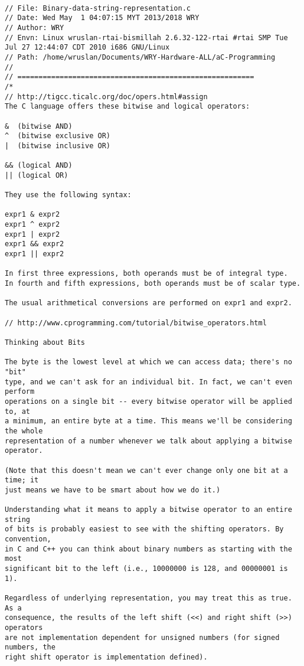 \begin{lstlisting}[caption={App4-Converting-software-codes-to-binary-bits-pulses}, label=App4-Converting-software-codes-to-binary-bits-pulses]

// File: Binary-data-string-representation.c
// Date: Wed May  1 04:07:15 MYT 2013/2018 WRY
// Author: WRY
// Envn: Linux wruslan-rtai-bismillah 2.6.32-122-rtai #rtai SMP Tue Jul 27 12:44:07 CDT 2010 i686 GNU/Linux
// Path: /home/wruslan/Documents/WRY-Hardware-ALL/aC-Programming
//
// ========================================================
/*
// http://tigcc.ticalc.org/doc/opers.html#assign
The C language offers these bitwise and logical operators:

&  (bitwise AND)
^  (bitwise exclusive OR)
|  (bitwise inclusive OR)

&& (logical AND)
|| (logical OR)

They use the following syntax:

expr1 & expr2
expr1 ^ expr2
expr1 | expr2
expr1 && expr2
expr1 || expr2

In first three expressions, both operands must be of integral type. 
In fourth and fifth expressions, both operands must be of scalar type. 

The usual arithmetical conversions are performed on expr1 and expr2.

// http://www.cprogramming.com/tutorial/bitwise_operators.html

Thinking about Bits

The byte is the lowest level at which we can access data; there's no "bit" 
type, and we can't ask for an individual bit. In fact, we can't even perform
operations on a single bit -- every bitwise operator will be applied to, at
a minimum, an entire byte at a time. This means we'll be considering the whole
representation of a number whenever we talk about applying a bitwise operator. 

(Note that this doesn't mean we can't ever change only one bit at a time; it
just means we have to be smart about how we do it.) 

Understanding what it means to apply a bitwise operator to an entire string 
of bits is probably easiest to see with the shifting operators. By convention, 
in C and C++ you can think about binary numbers as starting with the most 
significant bit to the left (i.e., 10000000 is 128, and 00000001 is 1). 

Regardless of underlying representation, you may treat this as true. As a 
consequence, the results of the left shift (<<) and right shift (>>) operators 
are not implementation dependent for unsigned numbers (for signed numbers, the 
right shift operator is implementation defined).


\end{lstlisting}
